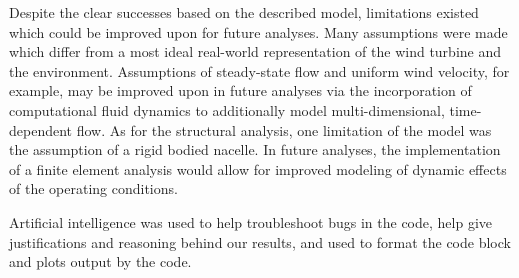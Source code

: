 \documentclass[11pt]{article}
\begin{document}
Despite the clear successes based on the described model, limitations existed which could be improved upon for future analyses. Many assumptions were made which differ from a most ideal real-world representation of the wind turbine and the environment. Assumptions of steady-state flow and uniform wind velocity, for example, may be improved upon in future analyses via the incorporation of computational fluid dynamics to additionally model multi-dimensional, time-dependent flow. As for the structural analysis, one limitation of the model was the assumption of a rigid bodied nacelle. In future analyses, the implementation of a finite element analysis would allow for improved modeling of dynamic effects of the operating conditions.

Artificial intelligence was used to help troubleshoot bugs in the code, help give justifications and reasoning behind our results, and used to format the code block and plots output by the code.


% 
% 
\end{document}
